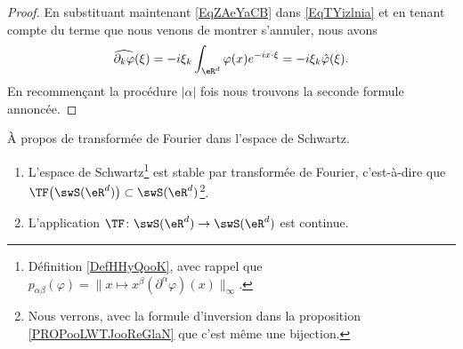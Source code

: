 \begin{proof}
	En substituant maintenant \eqref{EqZAeYaCB} dans \eqref{EqTYizlnia} et en tenant compte du terme que nous venons de montrer s'annuler, nous avons
	\begin{equation}
		\widehat{\partial_k\varphi}(\xi)=-i\xi_k\int_{\eR^d}\varphi(x) e^{-ix\cdot \xi}=-i\xi_k\hat\varphi(\xi).
	\end{equation}
	En recommençant la procédure \( | \alpha |\) fois nous trouvons la seconde formule annoncée.
\end{proof}

\begin{proposition} \label{PropKPsjyzT}
	À propos de transformée de Fourier dans l'espace de Schwartz.
	\begin{enumerate}
		\item
		      L'espace de Schwartz\footnote{Définition \ref{DefHHyQooK}, avec rappel que \( p_{\alpha\beta}(\varphi)=\| x\mapsto x^{\beta}(\partial^{\alpha}\varphi)(x) \|_{\infty}\).} est stable par transformée de Fourier, c'est-à-dire que \( \TF\big( \swS(\eR^d) \big)\subset \swS(\eR^d)\)\footnote{Nous verrons, avec la formule d'inversion dans la proposition \ref{PROPooLWTJooReGlaN} que c'est même une bijection.}.
		\item
		      L'application \( \TF\colon \swS(\eR^d)\to \swS(\eR^d)\) est continue.
	\end{enumerate}
\end{proposition}

